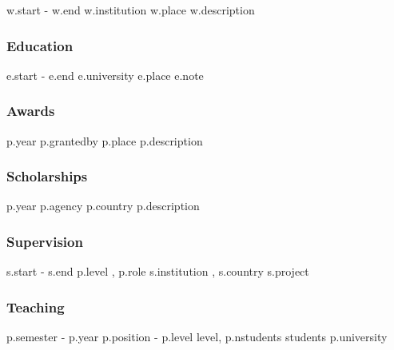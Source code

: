 \documentclass[10pt,letterpaper]{article} %
\begin{document}
{%
    { {{ w.start }} -   {{ w.end }} }
    { {{ w.institution }} }
    { {{ w.place }} }
    { {{ w.description }} }
{%


\subsubsection*{Education} %
{%
    { {{ e.start }} - {{ e.end }} }
    { {{ e.university }} }
    { {{ e.place}} }
    { {{ e.note }} }
{%

\subsubsection*{Awards}

{%
    { {{ p.year }} }
    { {{ p.grantedby }} }
    { {{p.place}} }
    { {{ p.description }} }{%

\subsubsection*{Scholarships}

{%
    { {{ p.year }} }
    { {{ p.agency }} }
    { {{ p.country }} }
    { {{ p.description }} } {%

\subsubsection*{Supervision}

{%
        { {{ s.start }} - {{s.end}} }
        {  {{ p.level }}, {{ p.role }}  }
        { {{ s.institution }}, {{ s.country }} }
        { { {{ s.project }} } }{%


\subsubsection*{Teaching}

{%
    { {{ p.semester }} - {{ p.year }}  }
    { {{ p.position }}  - {{ p.level }} level, {{ p.nstudents }} students }
    { {{ p.university }}  }
    {}{%



}}}}}}}}}}}}
\end{document}
